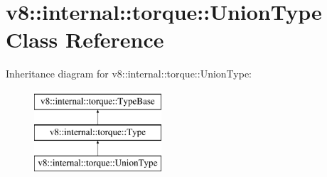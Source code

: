 \hypertarget{classv8_1_1internal_1_1torque_1_1UnionType}{}\section{v8\+:\+:internal\+:\+:torque\+:\+:Union\+Type Class Reference}
\label{classv8_1_1internal_1_1torque_1_1UnionType}
Inheritance diagram for v8\+:\+:internal\+:\+:torque\+:\+:Union\+Type\+:\begin{figure}[H]
\begin{center}
\leavevmode
\includegraphics[height=3.000000cm]{classv8_1_1internal_1_1torque_1_1UnionType}
\end{center}
\end{figure}
